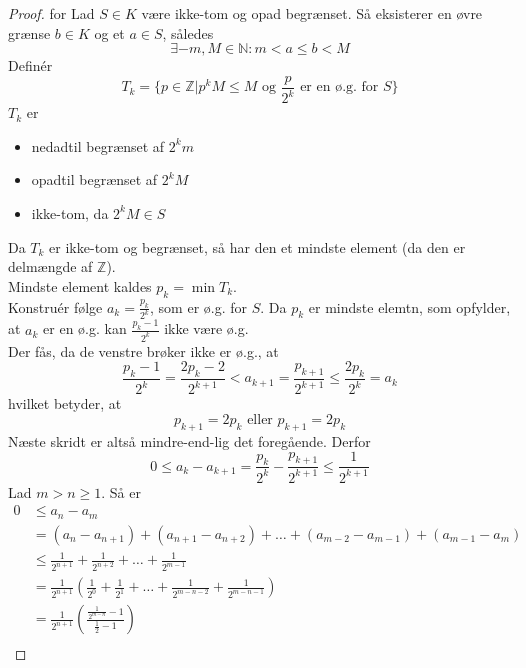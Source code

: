 \begin{proof} for Lad $S \in K$ være ikke-tom og opad begrænset. Så eksisterer en øvre grænse $b \in K$ og et $a \in S$, således 
\begin{equation}
\exists -m,M \in\mathbb{N}: m < a \leq b < M
\end{equation}
Definér
\begin{equation}
T_k = \{p \in \mathbb{Z}|p^kM \leq M\text{ og }\frac{p}{2^k}\text{ er en ø.g. for }S\}
\end{equation}
$T_k$ er
\begin{itemize}
\item nedadtil begrænset af $2^km$
\item opadtil begrænset af $2^kM$
\item ikke-tom, da $2^kM \in S$
\end{itemize}
Da $T_k$ er ikke-tom og begrænset, så har den et mindste element (da den er delmængde af $\mathbb{Z}$).\\
Mindste element kaldes $p_k = \min T_k$.\\
Konstruér følge $a_k = \frac{p_k}{2^k}$, som er ø.g. for $S$. Da $p_k$ er mindste elemtn, som opfylder, at $a_k$ er en ø.g. kan $\frac{p_k-1}{2^k}$ ikke være ø.g.\\
Der fås, da de venstre brøker ikke er ø.g., at
\begin{equation}
\frac{p_k-1}{2^k} = \frac{2p_k-2}{2^{k+1}} < a_{k+1} = \frac{p_{k+1}}{2^{k+1}} \leq \frac{2p_k}{2^k} = a_k
\end{equation}
hvilket betyder, at
\begin{equation}
p_{k+1} = 2p_k \text{ eller } p_{k+1} = 2p_k
\end{equation}
Næste skridt er altså mindre-end-lig det foregående. Derfor
\begin{equation}
0 \leq a_k - a_{k+1} = \frac{p_k}{2^k} - \frac{p_{k+1}}{2^{k+1}} \leq \frac{1}{2^{k+1}}
\end{equation}
Lad $m > n \geq 1$. Så er
\begin{align}
0 &\leq a_n - a_m\\
&= (a_n - a_{n+1})+(a_{n+1}-a_{n+2})+\hdots+(a_{m-2}-a_{m-1})+(a_{m-1}-a_m)\\
&\leq \frac{1}{2^{n+1}} + \frac{1}{2^{n+2}} +\hdots+\frac{1}{2^{m-1}}\\
&=\frac{1}{2^{n+1}}\left(\frac{1}{2^0}+\frac{1}{2^1}+\hdots+\frac{1}{2^{m-n-2}}+\frac{1}{2^{m-n-1}}\right)\\
&=\frac{1}{2^{n+1}}\left(\frac{\frac{1}{2^{m-n}}-1}{\frac{1}{2}-1}\right)\\

\end{align}
\end{proof}
